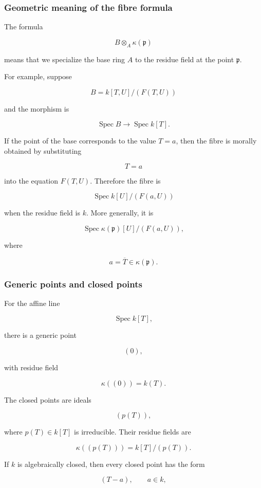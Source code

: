 \documentclass[12pt,a4paper]{article}
\theoremstyle{notespace}
\begin{document}
\subsubsection{Geometric meaning of the fibre formula}

The formula

\[
B\otimes_A \kappa(\mathfrak{p})
\]

means that we specialize the base ring \(A\) to the residue field at the point \(\mathfrak{p}\).

For example, suppose

\[
B=k[T,U]/(F(T,U))
\]

and the morphism is

\[
\operatorname{Spec}B\to \operatorname{Spec}k[T].
\]

If the point of the base corresponds to the value \(T=a\), then the fibre is morally obtained by substituting

\[
T=a
\]

into the equation \(F(T,U)\). Therefore the fibre is

\[
\operatorname{Spec}k[U]/(F(a,U))
\]

when the residue field is \(k\). More generally, it is

\[
\operatorname{Spec}\kappa(\mathfrak{p})[U]/(F(a,U)),
\]

where

\[
a=\overline{T}\in \kappa(\mathfrak{p}).
\]

\subsubsection{Generic points and closed points}

For the affine line

\[
\operatorname{Spec}k[T],
\]

there is a generic point

\[
(0),
\]

with residue field

\[
\kappa((0))=k(T).
\]

The closed points are ideals

\[
(p(T)),
\]

where \(p(T)\in k[T]\) is irreducible. Their residue fields are

\[
\kappa((p(T)))=k[T]/(p(T)).
\]

If \(k\) is algebraically closed, then every closed point has the form

\[
(T-a),
\qquad a\in k,
\]
\end{document}
